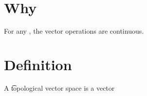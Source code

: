 

\section*{Why}

For any , the vector operations are continuous.

\section*{Definition}

A \t{topological vector space} is a vector

\blankpage